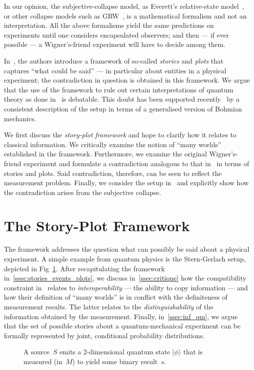 \documentclass[aps,pra,12pt]{revtex4-2}
\newcommand{\ket}[1]{|#1 \rangle}
\theoremstyle{definition}
\theoremstyle{remark}
\begin{document}
In our opinion, the subjective-collapse model, as Everett's relative-state model~\cite{everett1957relative}, or other collapse models such as GRW~\cite{GRW85}, is a mathematical formalism and not an interpretation.
All the above formalisms yield the same predictions on experiments until one considers encapsulated observers; and then --- if ever possible --- a Wigner's-friend experiment will have to decide among them.

In~\cite{FrRen}, the authors introduce a framework of so-called \emph{stories} and \emph{plots} that captures ``what could be said'' --- in particular about entities in a physical experiment;
the contradiction in question is obtained in this framework.
We argue that the use of the framework to rule out certain interpretations of quantum theory as done in~\cite{FrRen} is debatable.
This doubt has been supported recently~\cite{sudbery2016single} by a consistent description of the setup in terms of a generalised version of Bohmian mechanics. 

We first discuss the \emph{story-plot framework} and hope to clarify how it relates to classical information. 
We critically examine the notion of ``many worlds'' established in the framework.
Furthermore, we examine the original Wigner's-friend experiment and formulate a contradiction analogous to that in~\cite{FrRen} in terms of stories and plots.
Said contradiction, therefore, can be seen to reflect the measurement problem.
Finally, we consider the setup in~\cite{FrRen} and explicitly show how the contradiction arises from the subjective collapse.
 
\section{The Story-Plot Framework}
\noindent
The framework addresses the question what can possibly be said about a physical experiment. 
A simple example from quantum physics is the Stern-Gerlach setup, depicted in Fig~\ref{fig:Stern-Gerlach}.
After recapitulating the framework in~\ref{ssec:stories_events_plots}, we discuss in~\ref{ssec:critique} how the compatibility constraint in~\cite{FrRen} relates to \emph{interoperability} --- the ability to copy information --- and how their definition of ``many worlds'' is in conflict with the definiteness of measurement results. 
The latter relates to the \emph{distinguishability} of the information obtained by the measurement.
Finally, in~\ref{ssec:inf_qm}, we argue that the set of possible stories about a quantum-mechanical experiment can be formally represented by joint, conditional probability distributions.
\begin{figure}
\centering
{}
\caption{A source~$S$ emits a 2-dimensional quantum state $\ket{\phi}$ that is measured (in~$M$) to yield some binary result~$s$.}
\label{fig:Stern-Gerlach}
\end{figure}
\end{document}
